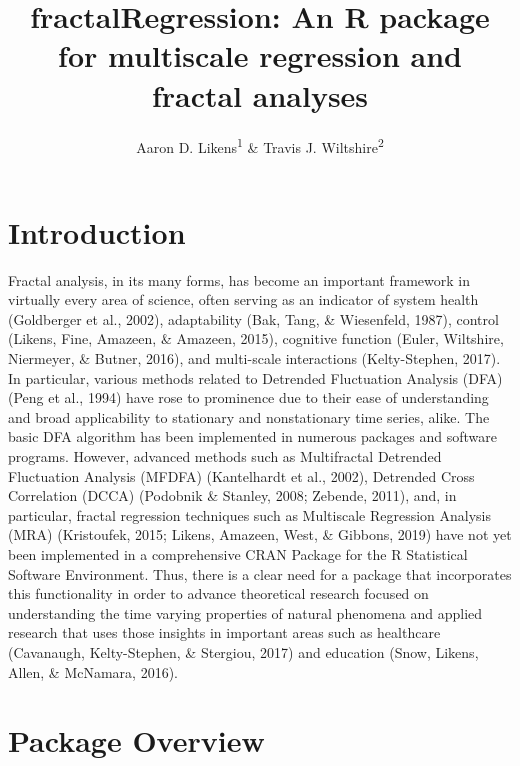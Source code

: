 \documentclass[
  english,
  man]{apa6}
\title{fractalRegression: An R package for multiscale regression and fractal analyses}
\author{Aaron D. Likens\textsuperscript{1} \& Travis J. Wiltshire\textsuperscript{2}}
\date{}
\affiliation{\vspace{0.5cm}\textsuperscript{1} Department of Biomechanics, University of Nebraska at Omaha\\\textsuperscript{2} Department of Cognitive Science \& Artificial Intelligence, Tilburg University}
\begin{document}
\maketitle

\hypertarget{introduction}{%
\section{Introduction}\label{introduction}}

Fractal analysis, in its many forms, has become an important framework
in virtually every area of science, often serving as an indicator of
system health (Goldberger et al., 2002), adaptability
(Bak, Tang, \& Wiesenfeld, 1987), control
(Likens, Fine, Amazeen, \& Amazeen, 2015), cognitive function
(Euler, Wiltshire, Niermeyer, \& Butner, 2016), and multi-scale interactions
(Kelty-Stephen, 2017). In particular, various
methods related to Detrended Fluctuation Analysis (DFA)
(Peng et al., 1994) have rose to prominence due to their
ease of understanding and broad applicability to stationary and
nonstationary time series, alike. The basic DFA algorithm has been
implemented in numerous packages and software programs. However,
advanced methods such as Multifractal Detrended Fluctuation Analysis
(MFDFA) (Kantelhardt et al., 2002), Detrended
Cross Correlation (DCCA) (Podobnik \& Stanley, 2008; Zebende, 2011), and, in particular,
fractal regression techniques such as Multiscale Regression Analysis
(MRA) (Kristoufek, 2015; Likens, Amazeen, West, \& Gibbons, 2019) have not yet been
implemented in a comprehensive CRAN Package for the R Statistical
Software Environment. Thus, there is a clear need for a package that
incorporates this functionality in order to advance theoretical research
focused on understanding the time varying properties of natural
phenomena and applied research that uses those insights in important
areas such as healthcare (Cavanaugh, Kelty-Stephen, \& Stergiou, 2017) and education (Snow, Likens, Allen, \& McNamara, 2016).

\hypertarget{package-overview}{%
\section{Package Overview}\label{package-overview}}
\end{document}
